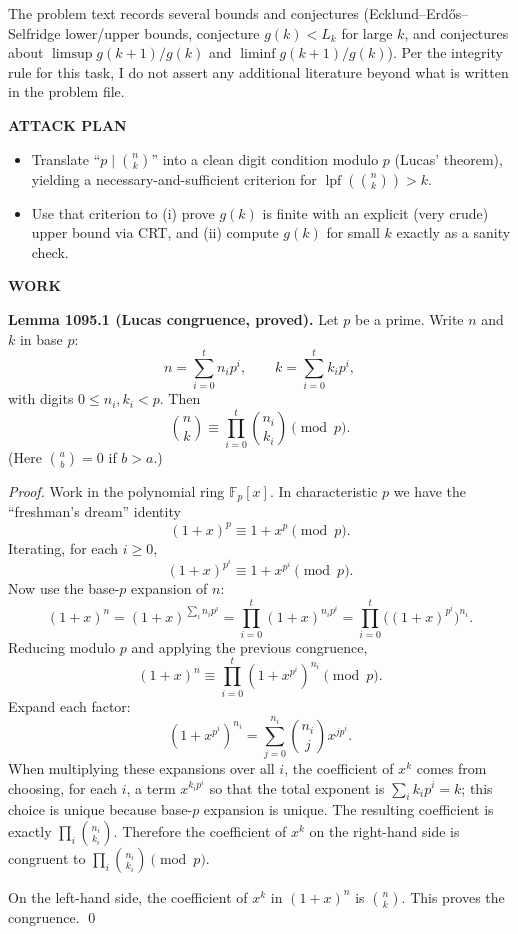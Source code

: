 \smallskip
\noindent
The problem text records several bounds and conjectures (Ecklund--Erd\H{o}s--Selfridge lower/upper bounds, conjecture $g(k)<L_k$ for large $k$, and conjectures about $\limsup g(k+1)/g(k)$ and $\liminf g(k+1)/g(k)$). Per the integrity rule for this task, I do not assert any additional literature beyond what is written in the problem file.

\medskip
\noindent\textbf{ATTACK PLAN}

\smallskip
\noindent
\begin{itemize}
\item Translate ``$p\mid\binom{n}{k}$'' into a clean digit condition modulo $p$ (Lucas' theorem), yielding a necessary-and-sufficient criterion for $\operatorname{lpf}(\binom{n}{k})>k$.
\item Use that criterion to (i) prove $g(k)$ is finite with an explicit (very crude) upper bound via CRT, and (ii) compute $g(k)$ for small $k$ exactly as a sanity check.
\end{itemize}

\medskip
\noindent\textbf{WORK}

\smallskip
\noindent\textbf{Lemma 1095.1 (Lucas congruence, proved).}
Let $p$ be a prime. Write $n$ and $k$ in base $p$:
\[
 n=\sum_{i=0}^t n_i p^i,\qquad k=\sum_{i=0}^t k_i p^i,
\]
with digits $0\le n_i,k_i<p$. Then
\[
\binom{n}{k}\equiv \prod_{i=0}^t \binom{n_i}{k_i} \pmod p.
\]
(Here $\binom{a}{b}=0$ if $b>a$.)

\smallskip
\noindent\emph{Proof.}
Work in the polynomial ring $\mathbb{F}_p[x]$. In characteristic $p$ we have the ``freshman's dream'' identity
\[
(1+x)^p \equiv 1+x^p \pmod p.
\]
Iterating, for each $i\ge 0$,
\[
(1+x)^{p^i} \equiv 1+x^{p^i} \pmod p.
\]
Now use the base-$p$ expansion of $n$:
\[
(1+x)^n=(1+x)^{\sum_i n_i p^i}=\prod_{i=0}^t (1+x)^{n_i p^i}=\prod_{i=0}^t \bigl((1+x)^{p^i}\bigr)^{n_i}.
\]
Reducing modulo $p$ and applying the previous congruence,
\[
(1+x)^n \equiv \prod_{i=0}^t (1+x^{p^i})^{n_i} \pmod p.
\]
Expand each factor:
\[
(1+x^{p^i})^{n_i}=\sum_{j=0}^{n_i} \binom{n_i}{j} x^{j p^i}.
\]
When multiplying these expansions over all $i$, the coefficient of $x^k$ comes from choosing, for each $i$, a term $x^{k_i p^i}$ so that the total exponent is $\sum_i k_i p^i=k$; this choice is unique because base-$p$ expansion is unique. The resulting coefficient is exactly $\prod_i \binom{n_i}{k_i}$. Therefore the coefficient of $x^k$ on the right-hand side is congruent to $\prod_i \binom{n_i}{k_i}\pmod p$.

On the left-hand side, the coefficient of $x^k$ in $(1+x)^n$ is $\binom{n}{k}$. This proves the congruence. \qed


